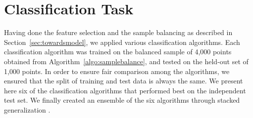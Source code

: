 \section{Classification Task}
\label{sec:classification}
Having done the feature selection and the sample balancing as described in Section~\ref{sec:towardsmodel}, we applied various classification algorithms. Each classification algorithm 
was trained on the balanced sample of 4,000 points obtained from Algorithm~\ref{algo:samplebalance}, and tested on the held-out set of 1,000 points. In order to ensure fair comparison among the algorithms, we ensured that the split of training and test data is always the same. We present here six of the classification 
algorithms that performed best on the independent test set. We finally created an ensemble of the six algorithms through stacked generalization \cite{Wolpert92}.


